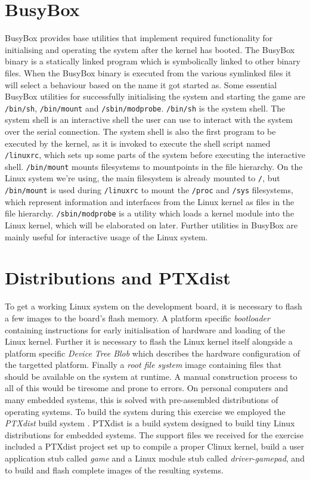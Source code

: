 \section{BusyBox}

BusyBox \cite{busy} provides base utilities that implement required
functionality for initialising and operating the system after the kernel has
booted. The BusyBox binary is a statically linked program which is symbolically
linked to other binary files. When the BusyBox binary is executed from the
various symlinked files it will select a behaviour based on the name it got
started as. Some essential BusyBox utilities for successfully initialising the
system and starting the game are \texttt{/bin/sh}, \texttt{/bin/mount} and
\texttt{/sbin/modprobe}. \texttt{/bin/sh} is the system shell. The system shell
is an interactive shell the user can use to interact with the system over the
serial connection. The system shell is also the first program to be executed by
the kernel, as it is invoked to execute the shell script named
\texttt{/linuxrc}, which sets up some parts of the system before executing the
interactive shell. \texttt{/bin/mount} mounts filesystems to mountpoints in the
file hierarchy. On the Linux system we're using, the main filesystem is already
mounted to \texttt{/}, but \texttt{/bin/mount} is used during \texttt{/linuxrc}
to mount the \texttt{/proc} and \texttt{/sys} filesystems, which represent
information and interfaces from the Linux kernel as files in the file hierarchy.
\texttt{/sbin/modprobe} is a utility which loads a kernel module into the Linux
kernel, which will be elaborated on later. Further utilities in BusyBox are
mainly useful for interactive usage of the Linux system.

\section{Distributions and PTXdist}

To get a working Linux system on the development board, it is necessary to flash
a few images to the board's flash memory. A platform specific \emph{bootloader}
containing instructions for early initialisation of hardware and loading of the
Linux kernel. Further it is necessary to flash the Linux kernel itself alongside
a platform specific \emph{Device Tree Blob} which describes the hardware
configuration of the targetted platform. Finally a \emph{root file system} image
containing files that should be available on the system at runtime. A manual
construction process to all of this would be tiresome and prone to errors. On
personal computers and many embedded systems, this is solved with pre-assembled
distributions of operating systems. To build the system during this exercise we
employed the \emph{PTXdist} build system \cite{TDT4528Compendium}. PTXdist is a
build system designed to build tiny Linux distributions for embedded systems.
The support files we received for the exercise included a PTXdist project set up
to compile a proper \textmu Clinux kernel, build a user application stub called
\emph{game} and a Linux module stub called \emph{driver-gamepad}, and to build
and flash complete images of the resulting systems.

